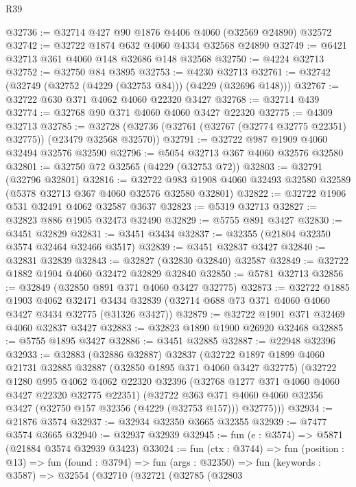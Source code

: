 \begin{lexlean}{R39}
\begin{coremodule}
@32736 := @32714 @427 @90 @1876 @4406 @4060 (@32569 @24890) @32572
@32742 := @32722 @1874 @632 @4060 @4334 @32568 @24890
@32749 := @6421 @32713 @361 @4060 @148 @32686 @148 @32568
@32750 := @4224 @32713
@32752 := @32750 @84 @3895
@32753 := @4230 @32713
@32761 := @32742 (@32749 (@32752 (@4229 (@32753 @84))) (@4229 (@32696 @148)))
@32767 := @32722 @630 @371 @4062 @4060 @22320 @3427
@32768 := @32714 @439
@32774 := @32768 @90 @371 @4060 @4060 @3427 @22320
@32775 := @4309 @32713
@32785 := @32728 (@32736 (@32761 (@32767 (@32774 @32775 @22351) @32775)) (@23479 @32568 @32570))
@32791 := @32722 @987 @1909 @4060 @32494 @32576 @32590
@32796 := @5054 @32713 @367 @4060 @32576 @32580
@32801 := @32750 @72 @32565 (@4229 (@32753 @72))
@32803 := @32791 (@32796 @32801)
@32816 := @32722
    @983
    @1908
    @4060
    @32493
    @32580
    @32589
    (@5378 @32713 @367 @4060 @32576 @32580 @32801)
@32822 := @32722 @1906 @531 @32491 @4062 @32587 @3637
@32823 := @5319 @32713
@32827 := @32823 @886 @1905 @32473 @32490
@32829 := @5755 @891 @3427
@32830 := @3451 @32829
@32831 := @3451 @3434
@32837 := @32355 (@21804 @32350 @3574 @32464 @32466 @3517)
@32839 := @3451 @32837 @3427
@32840 := @32831 @32839
@32843 := @32827 (@32830 @32840) @32587
@32849 := @32722 @1882 @1904 @4060 @32472 @32829 @32840
@32850 := @5781 @32713
@32856 := @32849 (@32850 @891 @371 @4060 @3427 @32775)
@32873 := @32722
    @1885
    @1903
    @4062
    @32471
    @3434
    @32839
    (@32714 @688 @73 @371 @4060 @4060 @3427 @3434 @32775 (@31326 @3427))
@32879 := @32722 @1901 @371 @32469 @4060 @32837 @3427
@32883 := @32823 @1890 @1900 @26920 @32468
@32885 := @5755 @1895 @3427
@32886 := @3451 @32885
@32887 := @22948 @32396
@32933 := @32883
    (@32886 @32887)
    @32837
    (@32722
      @1897
      @1899
      @4060
      @21731
      @32885
      @32887
      (@32850 @1895 @371 @4060 @3427 @32775)
      (@32722
        @1280
        @995
        @4062
        @4062
        @22320
        @32396
        (@32768 @1277 @371 @4060 @4060 @3427 @22320 @32775 @22351)
        (@32722
          @363
          @371
          @4060
          @4060
          @32356
          @3427
          (@32750 @157 @32356 (@4229 (@32753 @157)))
          @32775)))
@32934 := @21876 @3574
@32937 := @32934 @32350 @3665 @32355
@32939 := @7477 @3574 @3665
@32940 := @32937 @32939
@32945 := fun (e : @3574) => @5871 (@21884 @3574 @32939 @3423)
@33024 := fun (ctx : @3744) =>
  fun (position : @13) =>
  fun (found : @3794) =>
  fun (args : @32350) =>
  fun (keywords : @3587) =>
  @32554
    (@32710
      (@32721
        (@32785
          (@32803

\end{coremodule}
\end{lexlean}
